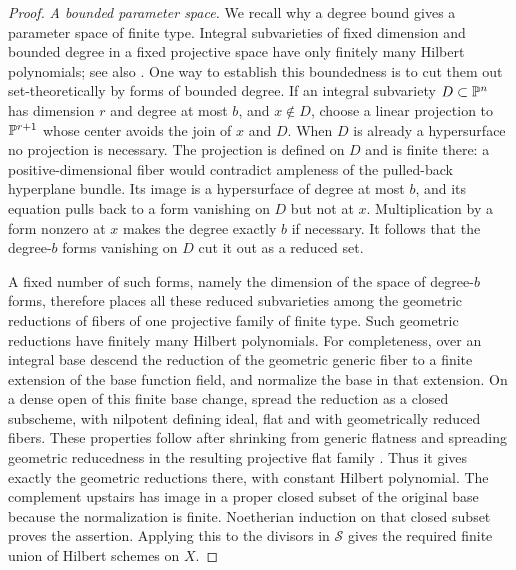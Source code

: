 \begin{proof}
\emph{A bounded parameter space.}
We recall why a degree bound gives a parameter space of finite type.
Integral subvarieties of fixed dimension
and bounded degree in a fixed projective space have only finitely many
Hilbert polynomials; see also \cite[Proposition~5.3]{Tanaka2024}.
One way to establish this boundedness is to cut them
out set-theoretically by forms of bounded degree.  If an integral
subvariety $D\subset\mathbb P^n$ has dimension $r$ and degree at most $b$, and
$x\notin D$, choose a linear projection to $\mathbb P^{r+1}$ whose center
avoids the join of $x$ and $D$.  When $D$ is already a hypersurface no
projection is necessary.  The projection is defined on $D$ and is finite
there: a positive-dimensional fiber would contradict ampleness of the
pulled-back hyperplane bundle.  Its image is a hypersurface of degree at
most $b$, and its equation pulls back to a form vanishing on $D$ but not
at $x$.  Multiplication by a form nonzero at $x$ makes the degree exactly
$b$ if necessary.  It follows that the degree-$b$ forms vanishing on $D$
cut it out as a reduced set.

A fixed number of such forms, namely the dimension of the space of
degree-$b$ forms, therefore places all these reduced subvarieties among
the geometric reductions of fibers of one projective family of finite
type.  Such geometric reductions have finitely many Hilbert polynomials.
For completeness, over an integral base descend the reduction of the
geometric generic fiber to a finite extension of the base function field,
and normalize the base in that extension.  On a dense open of this finite
base change, spread the reduction as a closed subscheme, with nilpotent
defining ideal, flat and with geometrically reduced fibers.  These
properties follow after shrinking from generic flatness and spreading
geometric reducedness in the resulting projective flat family
\cite[Tag~\texttt{0578}]{Stacks}.  Thus
it gives exactly the geometric reductions there, with constant Hilbert
polynomial.  The complement upstairs has image in a proper closed subset
of the original base because the normalization is finite.  Noetherian
induction on that closed subset proves the assertion.  Applying this to
the divisors in $\mathcal S$ gives the required finite union of Hilbert
schemes on $X$.


\end{proof}
